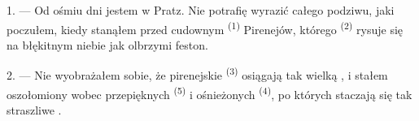 %
%
%
%

\VUsaut{4.0mm}
\VUsaut{3.0mm}

\VUsaut{3.0mm}

\VUsaut{3.0mm}

1. --- Od ośmiu dni jestem w Pratz. Nie potrafię wyrazić całego podziwu, jaki poczułem,
kiedy stanąłem przed cudownym  \textsuperscript{(1)} Pirenejów,
którego  \textsuperscript{(2)} rysuje się na błękitnym niebie jak olbrzymi
feston.

2. --- Nie wyobrażałem sobie, że pirenejskie  \textsuperscript{(3)}
osiągają tak wielką , i stałem oszołomiony wobec przepięknych
 \textsuperscript{(5)} i ośnieżonych  \textsuperscript{(4)},
po których staczają się tak straszliwe .

